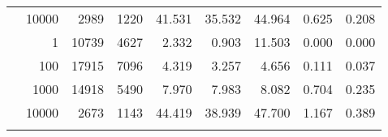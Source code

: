 \begin{table}
\begin{tabular}{rrrrrrrrr}
	            
					 &  
					 
					\multirow{ 1 }{*}{ 10000 } &
					
						
							    
							     2989  & 1220  
	                           & 41.531 & 35.532 & 44.964
	                           & 0.625 & 0.208  \\
	                
	            
	        
				\noalign{\smallskip}\hline
				\multirow{ 4 }{*}{ 500000 } &
				
					
					 
					\multirow{ 1 }{*}{ 1 } &
					
						
							    
							     10739  & 4627  
	                           & 2.332 & 0.903 & 11.503
	                           & 0.000 & 0.000  \\
	                
	            
					 &  
					 
					\multirow{ 1 }{*}{ 100 } &
					
						
							    
							     17915  & 7096  
	                           & 4.319 & 3.257 & 4.656
	                           & 0.111 & 0.037  \\
	                
	            
					 &  
					 
					\multirow{ 1 }{*}{ 1000 } &
					
						
							    
							     14918  & 5490  
	                           & 7.970 & 7.983 & 8.082
	                           & 0.704 & 0.235  \\
	                
	            
					 &  
					 
					\multirow{ 1 }{*}{ 10000 } &
					
						
							    
							     2673  & 1143  
	                           & 44.419 & 38.939 & 47.700
	                           & 1.167 & 0.389  \\
	                
	            
	        
				\noalign{\smallskip}\hline
				\multirow{ 4 }{*}{ 1000000 } &
				

\end{tabular}
\end{table}
